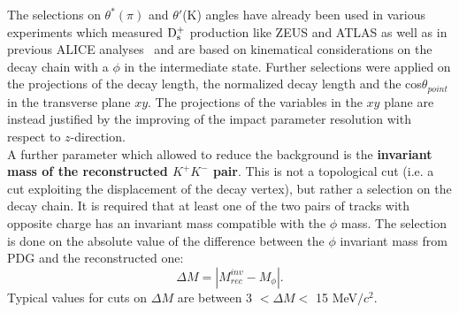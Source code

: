 The selections on $\theta^*(\pi)$ and $\theta'$(K) angles have already 
been used in various experiments which measured ${\rm D_s^+}$ production 
like ZEUS \cite{Chekanov:2005mm} and ATLAS \cite{ATLAS:2011fea} as well as 
in previous ALICE analyses~\cite{ALICE:2011aa,Abelev:2012tca,Adam:2016ich,Adam:2015jda}
 and are based on kinematical 
considerations on the decay chain with a $\phi$ in the intermediate state.
Further selections were applied on the projections of the decay length, 
the normalized decay length and the cos$\theta_{point}$ in the transverse 
plane $xy$. The projections of the variables in the $xy$ plane are instead justified by 
the improving of the impact parameter resolution with respect to $z$-direction.\\


A further parameter which allowed to reduce the background is the
 \textbf{invariant mass of the reconstructed $K^+K^-$ pair}. This is not a topological 
 cut (i.e. a cut exploiting the displacement of the decay vertex), 
 but rather a selection on the decay chain. It is required that at least 
 one of the two pairs of tracks with opposite charge has an invariant
  mass compatible with the $\phi$ mass. The selection is done on 
  the absolute value of the difference between the $\phi$ 
   invariant mass from PDG and the reconstructed one:
\[
\Delta M = |M^{inv}_{rec}-M_{\phi}|.
\]
Typical values for cuts on $\Delta M$ are between 3 $<\Delta M<$ 15 MeV$/c^2$.


